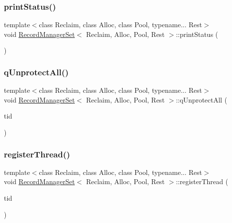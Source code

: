 \subsubsection{\texorpdfstring{print\+Status()}{printStatus()}}
{\footnotesize\ttfamily template$<$class Reclaim, class Alloc, class Pool, typename... Rest$>$ \\
void \hyperlink{classRecordManagerSet}{Record\+Manager\+Set}$<$ Reclaim, Alloc, Pool, Rest $>$\+::print\+Status (\begin{DoxyParamCaption}{ }\end{DoxyParamCaption})\hspace{0.3cm}{\ttfamily [inline]}}

\mbox{\label{classRecordManagerSet_ac2ffb64b677be27096a3ac3cd01e5bb4}} 
\subsubsection{\texorpdfstring{q\+Unprotect\+All()}{qUnprotectAll()}}
{\footnotesize\ttfamily template$<$class Reclaim, class Alloc, class Pool, typename... Rest$>$ \\
void \hyperlink{classRecordManagerSet}{Record\+Manager\+Set}$<$ Reclaim, Alloc, Pool, Rest $>$\+::q\+Unprotect\+All (\begin{DoxyParamCaption}\item[{const int}]{tid }\end{DoxyParamCaption})\hspace{0.3cm}{\ttfamily [inline]}}

\mbox{\label{classRecordManagerSet_aed788a9c714f6c4f51c15b804eded9a0}} 
\subsubsection{\texorpdfstring{register\+Thread()}{registerThread()}}
{\footnotesize\ttfamily template$<$class Reclaim, class Alloc, class Pool, typename... Rest$>$ \\
void \hyperlink{classRecordManagerSet}{Record\+Manager\+Set}$<$ Reclaim, Alloc, Pool, Rest $>$\+::register\+Thread (\begin{DoxyParamCaption}\item[{const int}]{tid }\end{DoxyParamCaption})\hspace{0.3cm}{\ttfamily [inline]}}

